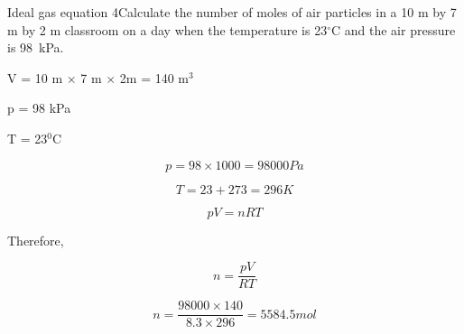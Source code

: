 \begin{wex}{Ideal gas equation 4}{Calculate the number of moles of air particles in a 10 m by 7 m by 2 m classroom on a day when the temperature is 23$^\circ$C and the air pressure is 98~kPa.\\}

{

V = 10 m $\times$ 7 m $\times$ 2m = 140 m$^{3}$

p = 98 kPa

T = 23$^{0}$C
\\
}

{

\begin{equation*}
p = 98 \times 1000 = 98 000 Pa
\end{equation*}

\begin{equation*}
T = 23 + 273 = 296 K
\end{equation*}
}

{

\begin{equation*}
pV = nRT
\end{equation*}

Therefore,

\begin{equation*}
n = \frac{pV}{RT}
\end{equation*}
}

{

\begin{equation*}
n = \frac{98 000 \times 140}{8.3 \times 296} = 5584.5 mol
\end{equation*}
}
\end{wex}

